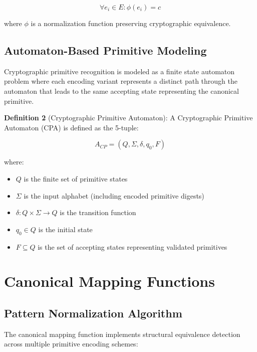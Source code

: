 \documentclass[11pt,a4paper]{article}
\begin{document}
$$\forall e_i \in E : \phi(e_i) = c$$

where $\phi$ is a normalization function preserving cryptographic equivalence.

\subsection{Automaton-Based Primitive Modeling}

Cryptographic primitive recognition is modeled as a finite state automaton problem where each encoding variant represents a distinct path through the automaton that leads to the same accepting state representing the canonical primitive.

\textbf{Definition 2} (Cryptographic Primitive Automaton): A Cryptographic Primitive Automaton (CPA) is defined as the 5-tuple:

$$A_{CP} = (Q, \Sigma, \delta, q_0, F)$$

where:
\begin{itemize}
    \item $Q$ is the finite set of primitive states
    \item $\Sigma$ is the input alphabet (including encoded primitive digests)
    \item $\delta : Q \times \Sigma \rightarrow Q$ is the transition function
    \item $q_0 \in Q$ is the initial state
    \item $F \subseteq Q$ is the set of accepting states representing validated primitives
\end{itemize}

\section{Canonical Mapping Functions}

\subsection{Pattern Normalization Algorithm}

The canonical mapping function implements structural equivalence detection across multiple primitive encoding schemes:
\end{document}
